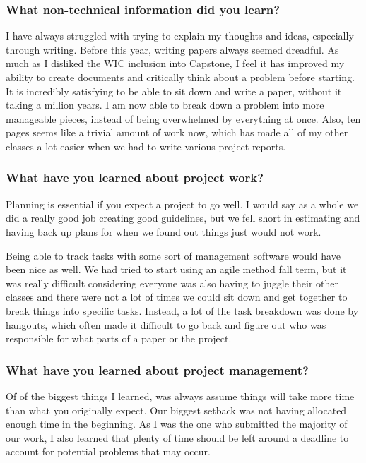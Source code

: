 \documentclass[compsoc,draftclsnofoot,onecolumn,10pt]{IEEEtran}
\begin{document}
\subsubsection*{What non-technical information did you learn?}
I have always struggled with trying to explain my thoughts and ideas, especially through writing.
Before this year, writing papers always seemed dreadful.
As much as I disliked the WIC inclusion into Capstone, I feel it has improved my ability to create documents and critically think about a problem before starting.
It is incredibly satisfying to be able to sit down and write a paper, without it taking a million years.
I am now able to break down a problem into more manageable pieces, instead of being overwhelmed by everything at once.
Also, ten pages seems like a trivial amount of work now, which has made all of my other classes a lot easier when we had to write various project reports. \par


\subsubsection*{What have you learned about project work?}
Planning is essential if you expect a project to go well. I would say as a whole we did a really good job creating good guidelines, but we fell short in estimating and having back up plans for when we found out things just would not work.

Being able to track tasks with some sort of management software would have been nice as well. We had tried to start using an agile method fall term, but it was really difficult considering everyone was also having to juggle their other classes and there were not a lot of times we could sit down and get together to break things into specific tasks. Instead, a lot of the task breakdown was done by hangouts, which often made it difficult to go back and figure out who was responsible for what parts of a paper or the project.

\subsubsection*{What have you learned about project management?}
Of of the biggest things I learned, was always assume things will take more time than what you originally expect. Our biggest setback was not having allocated enough time in the beginning. As I was the one who submitted the majority of our work, I also learned that plenty of time should be left around a deadline to account for potential problems that may occur.
\end{document}

